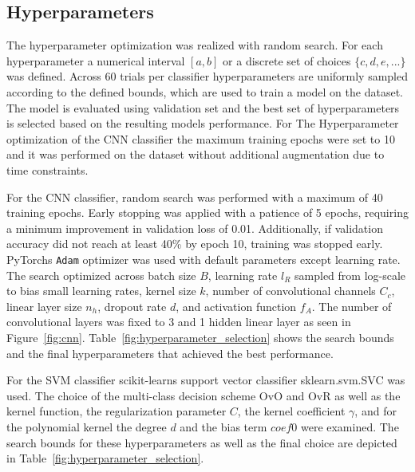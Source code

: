 \documentclass[a4, 10 pt, conference]{ieeeconf}  %
\begin{document}
\subsection{Hyperparameters}
\label{subsec:hyperparameters}

The hyperparameter optimization was realized with random search. For each 
hyperparameter a numerical interval $[a, b]$ or a discrete set of choices $\{c,d,e,...\}$ 
was defined. Across 60 trials per classifier hyperparameters are uniformly sampled according
to the defined bounds, which are used to train a model on the dataset. The model is
evaluated using validation set and the best set of hyperparameters is selected
based on the resulting models performance.
For The Hyperparameter optimization of the CNN classifier the maximum training epochs
were set to 10 and it was performed on the dataset without additional augmentation due 
to time constraints. 

For the CNN classifier, random search was performed with a maximum of 40 training epochs. 
Early stopping was applied with a patience of 5 epochs, requiring a minimum improvement in 
validation loss of 0.01. Additionally, if validation accuracy did not reach at least 40\% by 
epoch 10, training was stopped early. PyTorchs \texttt{Adam} optimizer was used with default
parameters except learning rate. The search optimized across batch size $B$, learning rate
$l_R$ sampled from log-scale to bias small learning rates, kernel size $k$, number of convolutional channels $C_c$, linear layer size $n_h$, dropout
rate $d$, and activation function $f_A$. The number of convolutional layers was fixed to 3
and 1 hidden linear layer as seen in Figure~\ref{fig:cnn}. Table~\ref{fig:hyperparameter_selection} 
shows the search bounds and the final hyperparameters that achieved the best performance.

For the SVM classifier scikit-learns support vector classifier sklearn.svm.SVC was used.
The choice of the multi-class decision scheme OvO and OvR as well as the kernel function, 
the regularization parameter $C$, the kernel coefficient $\gamma$, and for the 
polynomial kernel the degree $d$ and the bias term $coef0$ were examined. The search bounds for these
hyperparameters as well as the final choice are depicted in Table~\ref{fig:hyperparameter_selection}.
\end{document}
